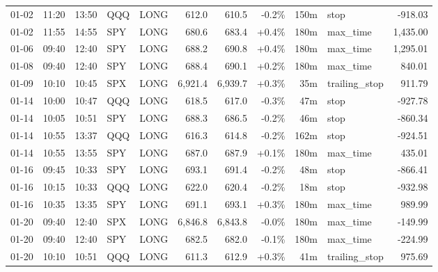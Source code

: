 \documentclass[11pt,a4paper,twoside]{article}
\begin{document}
\begin{center}
\begin{longtable}{>{\color{txtmain}}l l l l l r r r r >{\color{txtmain}}l r}
01-02 & 11:20 & 13:50 & QQQ & LONG & 612.0 & 610.5 & \textcolor{lossred}{-0.2\%} & 150m & stop & \textcolor{lossred}{-918.03} \\
01-02 & 11:55 & 14:55 & SPY & LONG & 680.6 & 683.4 & \textcolor{wingreen}{+0.4\%} & 180m & max\_time & \textcolor{wingreen}{1,435.00} \\
01-06 & 09:40 & 12:40 & SPY & LONG & 688.2 & 690.8 & \textcolor{wingreen}{+0.4\%} & 180m & max\_time & \textcolor{wingreen}{1,295.01} \\
01-08 & 09:40 & 12:40 & SPY & LONG & 688.4 & 690.1 & \textcolor{wingreen}{+0.2\%} & 180m & max\_time & \textcolor{wingreen}{840.01} \\
01-09 & 10:10 & 10:45 & SPX & LONG & 6,921.4 & 6,939.7 & \textcolor{wingreen}{+0.3\%} & 35m & trailing\_stop & \textcolor{wingreen}{911.79} \\
01-14 & 10:00 & 10:47 & QQQ & LONG & 618.5 & 617.0 & \textcolor{lossred}{-0.3\%} & 47m & stop & \textcolor{lossred}{-927.78} \\
01-14 & 10:05 & 10:51 & SPY & LONG & 688.3 & 686.5 & \textcolor{lossred}{-0.2\%} & 46m & stop & \textcolor{lossred}{-860.34} \\
01-14 & 10:55 & 13:37 & QQQ & LONG & 616.3 & 614.8 & \textcolor{lossred}{-0.2\%} & 162m & stop & \textcolor{lossred}{-924.51} \\
01-14 & 10:55 & 13:55 & SPY & LONG & 687.0 & 687.9 & \textcolor{wingreen}{+0.1\%} & 180m & max\_time & \textcolor{wingreen}{435.01} \\
01-16 & 09:45 & 10:33 & SPY & LONG & 693.1 & 691.4 & \textcolor{lossred}{-0.2\%} & 48m & stop & \textcolor{lossred}{-866.41} \\
01-16 & 10:15 & 10:33 & QQQ & LONG & 622.0 & 620.4 & \textcolor{lossred}{-0.2\%} & 18m & stop & \textcolor{lossred}{-932.98} \\
01-16 & 10:35 & 13:35 & SPY & LONG & 691.1 & 693.1 & \textcolor{wingreen}{+0.3\%} & 180m & max\_time & \textcolor{wingreen}{989.99} \\
01-20 & 09:40 & 12:40 & SPX & LONG & 6,846.8 & 6,843.8 & \textcolor{lossred}{-0.0\%} & 180m & max\_time & \textcolor{lossred}{-149.99} \\
01-20 & 09:40 & 12:40 & SPY & LONG & 682.5 & 682.0 & \textcolor{lossred}{-0.1\%} & 180m & max\_time & \textcolor{lossred}{-224.99} \\
01-20 & 10:10 & 10:51 & QQQ & LONG & 611.3 & 612.9 & \textcolor{wingreen}{+0.3\%} & 41m & trailing\_stop & \textcolor{wingreen}{975.69} \\

\end{longtable}
\end{center}
\end{document}
